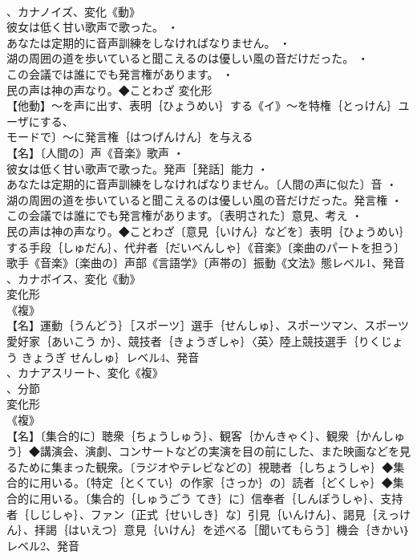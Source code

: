 \documentclass[8pt]{extreport}
\begin{document}
\begin{CJK}{UTF8}{min}
\\	、カナノイズ、変化《動》
\\	彼女は低く甘い歌声で歌った。 ・
\\	あなたは定期的に音声訓練をしなければなりません。 ・
\\	湖の周囲の道を歩いていると聞こえるのは優しい風の音だけだった。 ・
\\	この会議では誰にでも発言権があります。 ・
\\	民の声は神の声なり。◆ことわざ	変化形 
\\	【他動】～を声に出す、表明｛ひょうめい｝する《イ》～を特権｛とっけん｝ユーザにする、
\\	モードで〕～に発言権｛はつげんけん｝を与える
\\	【名】〔人間の〕声《音楽》歌声 ・
\\	彼女は低く甘い歌声で歌った。発声［発話］能力 ・
\\	あなたは定期的に音声訓練をしなければなりません。〔人間の声に似た〕音 ・
\\	湖の周囲の道を歩いていると聞こえるのは優しい風の音だけだった。発言権 ・
\\	この会議では誰にでも発言権があります。〔表明された〕意見、考え ・
\\	民の声は神の声なり。◆ことわざ〔意見｛いけん｝などを〕表明｛ひょうめい｝する手段｛しゅだん｝、代弁者｛だいべんしゃ｝《音楽》〔楽曲のパートを担う〕歌手《音楽》〔楽曲の〕声部《言語学》〔声帯の〕振動《文法》態レベル1、発音
\\	、カナボイス、変化《動》
\\	変化形 
\\	《複》
\\	【名】運動｛うんどう｝［スポーツ］選手｛せんしゅ｝、スポーツマン、スポーツ愛好家｛あいこう か｝、競技者｛きょうぎしゃ｝〈英〉陸上競技選手｛りくじょう きょうぎ せんしゅ｝レベル4、発音
\\	、カナアスリート、変化《複》
\\	、分節
\\	変化形 
\\	《複》
\\	【名】〔集合的に〕聴衆｛ちょうしゅう｝、観客｛かんきゃく｝、観衆｛かんしゅう｝◆講演会、演劇、コンサートなどの実演を目の前にした、また映画などを見るために集まった観衆。〔ラジオやテレビなどの〕視聴者｛しちょうしゃ｝◆集合的に用いる。〔特定｛とくてい｝の作家｛さっか｝の〕読者｛どくしゃ｝◆集合的に用いる。〔集合的｛しゅうごう てき｝に〕信奉者｛しんぽうしゃ｝、支持者｛しじしゃ｝、ファン〔正式｛せいしき｝な〕引見｛いんけん｝、謁見｛えっけん｝、拝謁｛はいえつ｝意見｛いけん｝を述べる［聞いてもらう］機会｛きかい｝レベル2、発音

\end{CJK}
\end{document}
